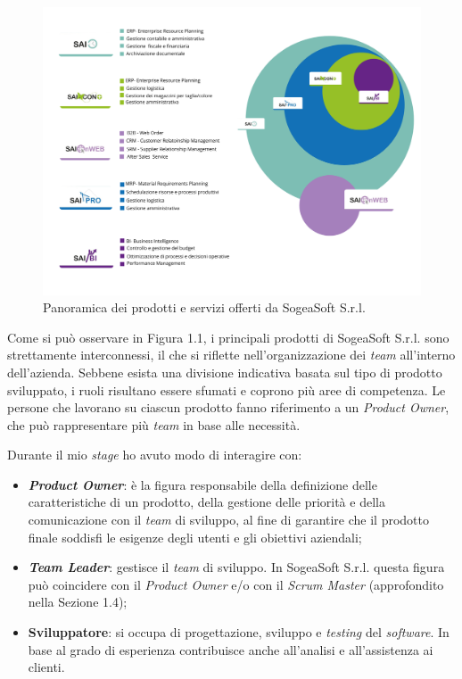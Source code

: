     \begin{figure}
        \centering
        \includegraphics[width=0.9\linewidth]{BCS-Tessi/images/SOGEAProdotti.png}
        \caption[Prodotti di SogeaSoft S.r.l.]{Panoramica dei prodotti e servizi offerti da SogeaSoft S.r.l.}
        \label{fig:panoramica_prodotti}
    \end{figure}

    \noindent Come si può osservare in Figura 1.1, i principali prodotti di SogeaSoft S.r.l. sono strettamente interconnessi, il che si riflette nell’organizzazione dei \textit{team} all’interno dell’azienda. Sebbene esista una divisione indicativa basata sul tipo di prodotto sviluppato, i ruoli risultano essere sfumati e coprono più aree di competenza. 
    \noindent Le persone che lavorano su ciascun prodotto fanno riferimento a un \textit{Product Owner}, che può rappresentare più \textit{team} in base alle necessità.

    \noindent Durante il mio \textit{stage} ho avuto modo di interagire con: 
    \begin{itemize}
        \item \textbf{\textit{Product Owner}}: è la figura responsabile della definizione delle caratteristiche di un prodotto, della gestione delle priorità e della comunicazione con il \textit{team} di sviluppo, al fine di garantire che il prodotto finale soddisfi le esigenze degli utenti e gli obiettivi aziendali;
        
        \item \textbf{\textit{Team Leader}}: gestisce il \textit{team} di sviluppo. In SogeaSoft S.r.l. questa figura può coincidere con il \textit{Product Owner} e/o con il \textit{Scrum Master} (approfondito nella Sezione 1.4);
        \item \textbf{Sviluppatore}: si occupa di progettazione, sviluppo e \textit{testing} del \textit{software}. In base al grado di esperienza contribuisce anche all'analisi e all'assistenza ai clienti. 
    \end{itemize}


